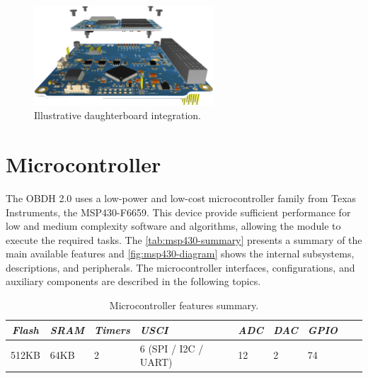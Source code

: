 \begin{figure}[!ht]
    \begin{center}
        \includegraphics[width=0.6\textwidth]{figures/daughterboard-integration.png}
        \caption{Illustrative daughterboard integration.}
        \label{fig:daughterboard-integration}
    \end{center}
\end{figure}

\section{Microcontroller}

The OBDH 2.0 uses a low-power and low-cost microcontroller family from Texas Instruments, the MSP430-F6659. This device provide sufficient performance for low and medium complexity software and algorithms, allowing the module to execute the required tasks. The \autoref{tab:msp430-summary} presents a summary of the main available features and \autoref{fig:msp430-diagram} shows the internal subsystems, descriptions, and peripherals. The microcontroller interfaces, configurations, and auxiliary components are described in the following topics.

\begin{table}[!h]
    \centering
    \begin{tabular}{cllllllll}
        \toprule[1.5pt]
        \textit{Flash} & \textit{SRAM} & \textit{Timers} & \textit{USCI} & \textit{ADC} & \textit{DAC} & \textit{GPIO} \\
        \midrule
        512KB  & 64KB  & 2  & 6 (SPI / I2C / UART)  & 12  & 2  & 74           \\
        \bottomrule[1.5pt]
    \end{tabular}
    \caption{Microcontroller features summary.}
    \label{tab:msp430-summary}
\end{table}

